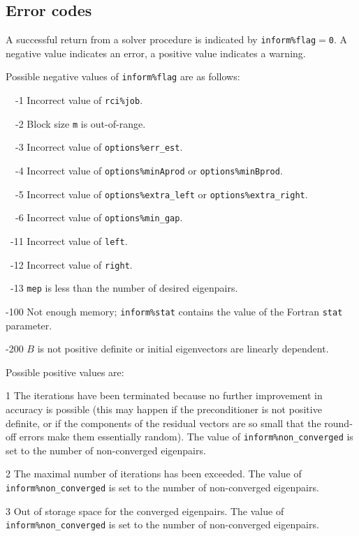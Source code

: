 \subsection{Error codes}

\label{sec:err}

A successful return from
a solver procedure
is indicated 
by {\tt inform\%flag$=$0}.
A negative value indicates an error, a positive value indicates a warning.

\label{sec:err.solve}

Possible negative values of {\tt inform\%flag}
are as follows:
%
\begin{description}
%
\item{~~-1}
\hskip 9pt
Incorrect value of {\tt rci\%job}.
%
\item{~~-2}
\hskip 9pt
Block size {\tt m} is out-of-range.
%
\item{~~-3}
\hskip 9pt
Incorrect value of 
{\tt options\%err\_est}. %
%
\item{~~-4}
\hskip 9pt
Incorrect value of 
{\tt options\%minAprod} or {\tt options\%minBprod}.
%
\item{~~-5}
\hskip 9pt
Incorrect value of 
{\tt options\%extra\_left} or
{\tt options\%extra\_right}.
%
\item{~~-6}
\hskip 9pt
Incorrect value of 
{\tt options\%min\_gap}. %
%
\item{~-11}
\hskip 7pt
Incorrect value of 
{\tt left}. %
%
\item{~-12}
\hskip 7pt
Incorrect value of 
{\tt right}. %
%
\item{~-13}
\hskip 7pt
{\tt mep} is less than 
the number of desired eigenpairs.
%
\item{-100}
\hskip 4pt
Not enough memory;
{\tt inform\%stat} contains the value of the Fortran {\tt stat} parameter.
%
\item{-200}
\hskip 4pt
$B$ is not positive definite or initial eigenvectors are linearly dependent.
%
\end{description}

Possible positive values  are: 
%
\begin{description}
\item{1}
\hskip 9pt
The iterations have been terminated because no further improvement
in accuracy is possible (this may happen if the preconditioner is
not positive definite, or if the components of the residual vectors
are so small that the round-off
errors make them essentially random).
The value of {\tt inform\%non\_converged} is set to the number
of non-converged eigenpairs.
\item{2}
\hskip 9pt
The maximal number of iterations has been exceeded.
The value of {\tt inform\%non\_converged} is set to the number
of non-converged eigenpairs.
\item{3}
\hskip 9pt
Out of storage space for the converged eigenpairs.
The value of {\tt inform\%non\_converged} is set to the number
of non-converged eigenpairs.
%
\end{description}

